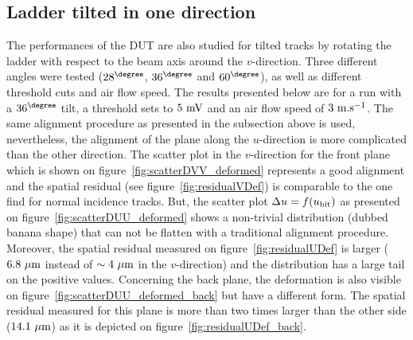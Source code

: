     \subsection{Ladder tilted in one direction}
    \label{subsec:deformation}

      The performances of the \gls{DUT} are also studied for tilted tracks by rotating the ladder with respect to the beam axis around the $v$-direction.
      Three different angles were tested ($28^{\degree}$, $36^{\degree}$ and $60^{\degree}$), as well as different threshold cuts and air flow speed. 
      The results presented below are for a run with a $36^{\degree}$ tilt, a threshold sets to $5~\rm{mV}$ and an air flow speed of $3~\rm{m.s}^{-1}$.
      The same alignment procedure as presented in the subsection above is used, nevertheless, the alignment of the plane along the $u$-direction is more complicated than the other direction.
      The scatter plot in the $v$-direction for the front plane which is shown on figure~\ref{fig:scatterDVV_deformed} represents a good alignment and the spatial residual (see figure~\ref{fig:residualVDef}) is comparable to the one find for normal incidence tracks.
      But, the scatter plot $\Delta u = f(u_{\rm{hit}})$ as presented on figure~\ref{fig:scatterDUU_deformed} shows a non-trivial distribution (dubbed banana shape) that can not be flatten with a traditional alignment procedure.
      Moreover, the spatial residual measured on figure~\ref{fig:residualUDef} is larger ($6.8~\rm{\mu m}$ instead of $\sim 4~\rm{\mu m}$ in the $v$-direction) and the distribution has a large tail on the positive values.
      Concerning the back plane, the deformation is also visible on figure~\ref{fig:scatterDUU_deformed_back} but have a different form.
      The spatial residual measured for this plane is more than two times larger than the other side ($14.1~\rm{\mu m}$) as it is depicted on figure~\ref{fig:residualUDef_back}.

